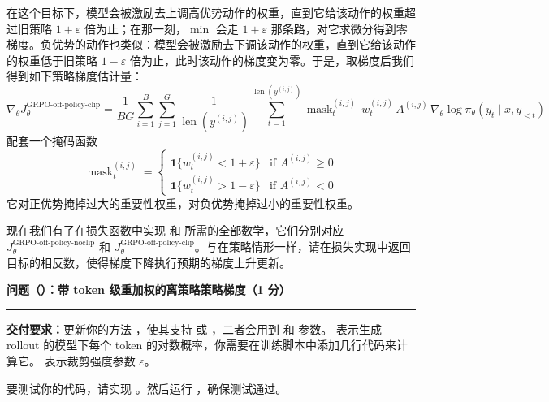 在这个目标下，模型会被激励去上调高优势动作的权重，直到它给该动作的权重超过旧策略 $1+\varepsilon$ 倍为止；在那一刻，$\min$ 会走 $1+\varepsilon$ 那条路，对它求微分得到零梯度。负优势的动作也类似：模型会被激励去下调该动作的权重，直到它给该动作的权重低于旧策略 $1-\varepsilon$ 倍为止，此时该动作的梯度变为零。于是，取梯度后我们得到如下策略梯度估计量：
\begin{equation}
\nabla_\theta J_\theta^{\text{GRPO-off-policy-clip}} = \frac{1}{BG}\sum_{i=1}^{B}\sum_{j=1}^{G}\frac{1}{\operatorname{len}\!\left(y^{(i,j)}\right)}\sum_{t=1}^{\operatorname{len}\!\left(y^{(i,j)}\right)} \operatorname{mask}_t^{(i,j)}\, w_t^{(i,j)}\, A^{(i,j)}\, \nabla_\theta \log \pi_\theta(y_t \mid x, y_{<t})
\end{equation}
配套一个掩码函数
\begin{equation}
\operatorname{mask}_t^{(i,j)} =
\begin{cases}
\mathbf{1}\{w_t^{(i,j)} < 1+\varepsilon\} & \text{if } A^{(i,j)} \geq 0\\
\mathbf{1}\{w_t^{(i,j)} > 1-\varepsilon\} & \text{if } A^{(i,j)} < 0
\end{cases}
\end{equation}
它对正优势掩掉过大的重要性权重，对负优势掩掉过小的重要性权重。

现在我们有了在损失函数中实现  和  所需的全部数学，它们分别对应 $J_\theta^{\text{GRPO-off-policy-noclip}}$ 和 $J_\theta^{\text{GRPO-off-policy-clip}}$。与在策略情形一样，请在损失实现中返回目标的相反数，使得梯度下降执行预期的梯度上升更新。

\medskip
\noindent\textbf{问题（）：带 token 级重加权的离策略策略梯度（1 分）}
\par\nobreak\smallskip\hrule\nobreak\medskip

\textbf{交付要求：}更新你的方法 ，使其支持  或 ，二者会用到  和  参数。 表示生成 rollout 的模型下每个 token 的对数概率，你需要在训练脚本中添加几行代码来计算它。 表示裁剪强度参数 $\varepsilon$。

要测试你的代码，请实现 。然后运行 ，确保测试通过。

